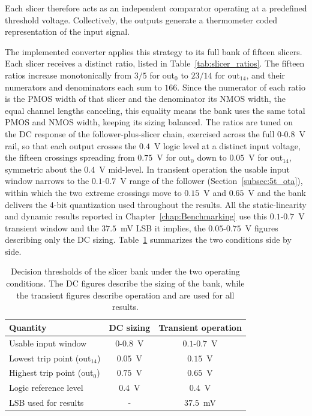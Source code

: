 Each slicer therefore acts as an independent comparator operating at a predefined threshold voltage. Collectively, the outputs generate a thermometer coded representation of the input signal.

The implemented converter applies this strategy to its full bank of fifteen slicers. Each slicer receives a distinct ratio, listed in Table~\ref{tab:slicer_ratios}. The fifteen ratios increase monotonically from $3/5$ for out$_0$ to $23/14$ for out$_{14}$, and their numerators and denominators each sum to $166$. Since the numerator of each ratio is the PMOS width of that slicer and the denominator its NMOS width, the equal channel lengths canceling, this equality means the bank uses the same total PMOS and NMOS width, keeping its sizing balanced. The ratios are tuned on the DC response of the follower-plus-slicer chain, exercised across the full $0$-$0.8$~V rail, so that each output crosses the $0.4$~V logic level at a distinct input voltage, the fifteen crossings spreading from $0.75$~V for out$_0$ down to $0.05$~V for out$_{14}$, symmetric about the $0.4$~V mid-level. In transient operation the usable input window narrows to the $0.1$-$0.7$~V range of the follower (Section~\ref{subsec:5t_ota}), within which the two extreme crossings move to $0.15$~V and $0.65$~V and the bank delivers the 4-bit quantization used throughout the results. All the static-linearity and dynamic results reported in Chapter~\ref{chap:Benchmarking} use this $0.1$-$0.7$~V transient window and the $37.5$~mV LSB it implies, the $0.05$-$0.75$~V figures describing only the DC sizing. Table~\ref{tab:bands} summarizes the two conditions side by side.

\begin{table}[htbp]
    \centering
    \caption{Decision thresholds of the slicer bank under the two operating conditions. The DC figures describe the sizing of the bank, while the transient figures describe operation and are used for all results.}
    \label{tab:bands}
    \renewcommand{\arraystretch}{1.2}
    \begin{tabular}{lcc}
        \toprule
        \textbf{Quantity} & \textbf{DC sizing} & \textbf{Transient operation} \\
        \midrule
        Usable input window            & $0$-$0.8$~V  & $0.1$-$0.7$~V \\
        Lowest trip point (out$_{14}$) & $0.05$~V      & $0.15$~V \\
        Highest trip point (out$_0$)   & $0.75$~V      & $0.65$~V \\
        Logic reference level          & $0.4$~V       & $0.4$~V \\
        LSB used for results           & -           & $37.5$~mV \\
        \bottomrule
    \end{tabular}
\end{table}


